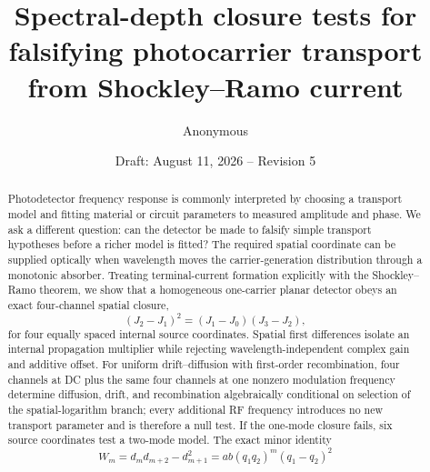 \documentclass[11pt]{article}
\title{Spectral-depth closure tests for falsifying photocarrier transport from Shockley--Ramo current}
\author{Anonymous}
\date{Draft: August 11, 2026 -- Revision 5}
\begin{document}
\maketitle

\begin{abstract}
Photodetector frequency response is commonly interpreted by choosing a transport model and fitting material or circuit parameters to measured amplitude and phase. We ask a different question: can the detector be made to falsify simple transport hypotheses before a richer model is fitted? The required spatial coordinate can be supplied optically when wavelength moves the carrier-generation distribution through a monotonic absorber. Treating terminal-current formation explicitly with the Shockley--Ramo theorem, we show that a homogeneous one-carrier planar detector obeys an exact four-channel spatial closure,
\begin{equation*}
(J_2-J_1)^2=(J_1-J_0)(J_3-J_2),
\end{equation*}
for four equally spaced internal source coordinates. Spatial first differences isolate an internal propagation multiplier while rejecting wavelength-independent complex gain and additive offset. For uniform drift--diffusion with first-order recombination, four channels at DC plus the same four channels at one nonzero modulation frequency determine diffusion, drift, and recombination algebraically conditional on selection of the spatial-logarithm branch; every additional RF frequency introduces no new transport parameter and is therefore a null test. If the one-mode closure fails, six source coordinates test a two-mode model. The exact minor identity
\begin{equation*}
W_m=d_m d_{m+2}-d_{m+1}^2
=ab(q_1q_2)^m(q_1-q_2)^2
\end{equation*}

\end{abstract}
\end{document}
